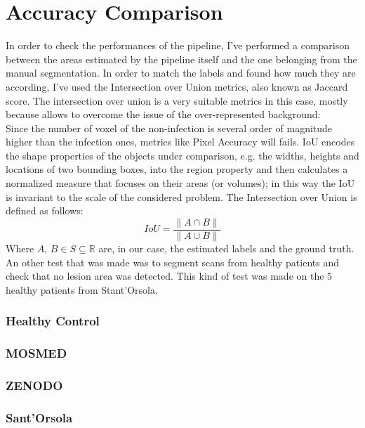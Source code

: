 \documentclass{standalone}
\begin{document}
	\section{Accuracy Comparison}	
	
	In order to check the performances of the pipeline, I've performed a comparison between the areas estimated by the pipeline itself and the one belonging from the manual segmentation. In order to match the labels and found how much they are according, I've used the Intersection over Union metrics, also known as Jaccard score. The intersection over union is a very suitable metrics in this case, mostly because allows  to overcome the issue of the over-represented background:\\
	Since the number of voxel of the non-infection is several order of magnitude higher than the infection ones, metrics like Pixel Accuracy will fails.
	IoU encodes the shape properties of the objects under comparison, e.g. the widths, heights and locations of two bounding boxes, into the region property and then calculates a normalized measure that focuses on their areas (or volumes); in this way the IoU is invariant to the scale of the considered problem. 
	The Intersection over Union is defined as follows: 
	\begin{equation*}
		IoU = \frac{\|A \cap B \|}{\| A \cup B \|}
	\end{equation*}
	Where $A,\, B\in S\subseteq\mathbb{R}$ are, in our case, the estimated labels and the ground truth.\\

	An other test that was made was to segment scans from healthy patients and check that no lesion area was detected. This kind of test was made on the $5$ healthy patients from Stant'Orsola.\\
	
	\subsubsection*{Healthy Control}
	\subsubsection*{MOSMED}
	
	\subsubsection*{ZENODO}
	
	\subsubsection*{Sant'Orsola}
\end{document}
